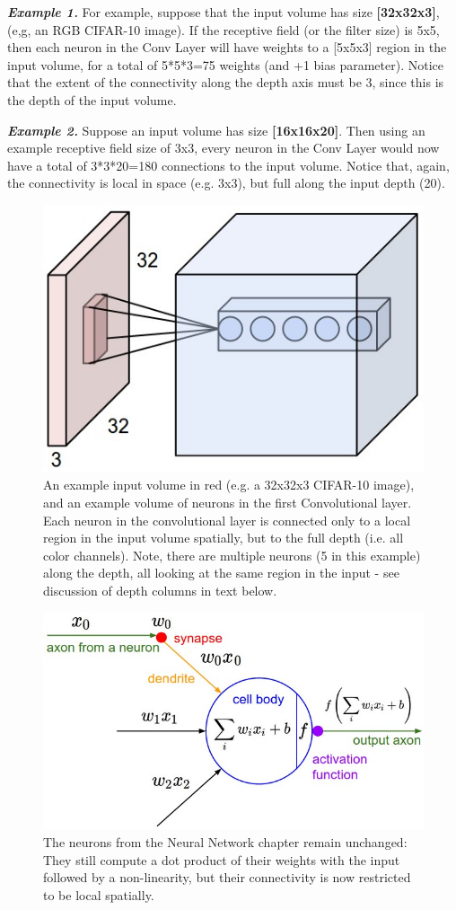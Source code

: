 \documentclass[fleqn,10pt]{olplainarticle}
\theoremstyle{definition}
\theoremstyle{remark}
\begin{document}
\textbf{\textit{Example 1.}} For example, suppose that the input volume has size \textbf{[32x32x3]}, (e,g, an RGB CIFAR-10 image). If the receptive field (or the filter size) is 5x5, then each neuron in the Conv Layer will have weights to a [5x5x3] region in the input volume, for a total of 5*5*3=75 weights (and +1 bias parameter). Notice that the extent of the connectivity along the depth axis must be 3, since this is the depth of the input volume.

\textbf{\textit{Example 2.}} Suppose an input volume has size \textbf{[16x16x20]}. Then using an example receptive field size of 3x3, every neuron in the Conv Layer would now have a total of 3*3*20=180 connections to the input volume. Notice that, again, the connectivity is local in space (e.g. 3x3), but full along the input depth (20).

\begin{figure}[ht]
\centering
\includegraphics[width=0.7\linewidth]{images/depthcol}
\caption{An example input volume in red (e.g. a 32x32x3 CIFAR-10 image), and an example volume of neurons in the first Convolutional layer. Each neuron in the convolutional layer is connected only to a local region in the input volume spatially, but to the full depth (i.e. all color channels). Note, there are multiple neurons (5 in this example) along the depth, all looking at the same region in the input - see discussion of depth columns in text below.}
\label{fig:Example Input Volume}
\end{figure}

\begin{figure}[ht]
\centering
\includegraphics[width=0.7\linewidth]{images/neuron_model}
\caption{The neurons from the Neural Network chapter remain unchanged: They still compute a dot product of their weights with the input followed by a non-linearity, but their connectivity is now restricted to be local spatially.}
\label{fig:Example Neurons}
\end{figure}
\end{document}
